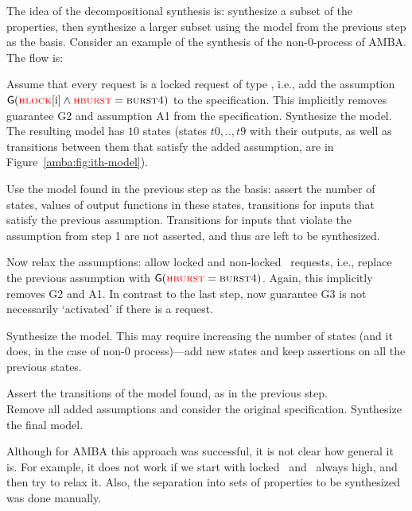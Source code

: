   The idea of the decompositional synthesis is:
  synthesize a subset of the properties,
  then synthesize a larger subset using the model from the previous step as the basis.
  Consider an example of the synthesis of the non-0-process of AMBA.
  The flow is: 
  \begin{enumerate}
  \- Assume that every request is a locked request of type \hburstfour, i.e., 
     add the assumption $\operatorname{\mathsf{G}}(\textsc{\textcolor{red}{hlock}}[\textrm{i}]\land\textsc{\textcolor{red}{hburst}}=\textsc{burst4})$ to the specification.
     This implicitly removes guarantee G2 and assumption A1 from the specification.
     Synthesize the model. The resulting model has $10$ states
     (states $t0,..,t9$ with their outputs, as well as transitions between them that satisfy the added assumption,
      are in Figure~\ref{amba:fig:ith-model}).

  \- Use the model found in the previous step as the basis:
     assert the number of states, values of output functions in these states, transitions for inputs that satisfy the previous assumption.
     Transitions for inputs that violate the assumption from step 1 are not asserted, and thus are left to be synthesized.

     Now relax the assumptions: allow locked and non-locked \hburstfour\ requests, i.e., replace the previous assumption with $\operatorname{\mathsf{G}}(\textsc{\textcolor{red}{hburst}}=\textsc{burst4})$.
     Again, this implicitly removes G2 and A1.
     In contrast to the last step, now guarantee G3 is not necessarily `activated' if there is a request.

     Synthesize the model.
     This may require increasing the number of states (and it does, in the case of non-0 process)---add new states and keep assertions on all the previous states.

  \- Assert the transitions of the model found, as in the previous step.\\
     Remove all added assumptions and consider the original specification.
     Synthesize the final model.
\end{enumerate}

Although for AMBA this approach was successful, it is not clear how general it is.
For example, it does not work if we start with locked \hburstfour\ and \hready\ always high,
and then try to relax it.
Also, the separation into sets of properties to be synthesized was done manually.


